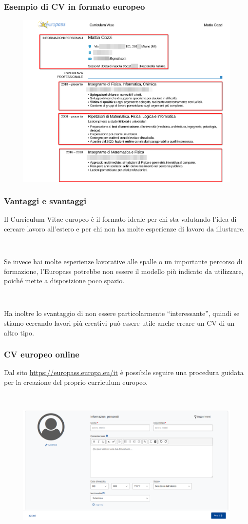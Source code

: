 \documentclass[handout]{beamer}
\begin{document}
\begin{frame}
\frametitle{Esempio di CV in formato europeo}
\begin{figure}
  \includegraphics[width=.9\columnwidth]{img/cveuromc.png}
\end{figure}
\end{frame}

\begin{frame}
\frametitle{Vantaggi e svantaggi}
Il Curriculum Vitae europeo è il formato ideale per chi sta valutando l'idea di cercare lavoro all'estero e per chi non ha molte esperienze di lavoro da illustrare.\pause

~

Se invece hai molte esperienze lavorative alle spalle o un importante percorso di formazione, l'Europass potrebbe non essere il modello più indicato da utilizzare, poiché mette a disposizione poco spazio.\pause

~

Ha inoltre lo svantaggio di non essere particolarmente ``interessante'', quindi se stiamo cercando lavori più creativi può essere utile anche creare un CV di un altro tipo.
\end{frame}



\begin{frame}
\frametitle{CV europeo online}
Dal sito \href{https://europass.europa.eu/it}{https://europass.europa.eu/it} è possibile seguire una \alert{procedura guidata} per la creazione del proprio curriculum europeo.

~

\begin{figure}
  \includegraphics[width=.8\columnwidth]{img/cvonline.png}
\end{figure}
\end{frame}
\end{document}
